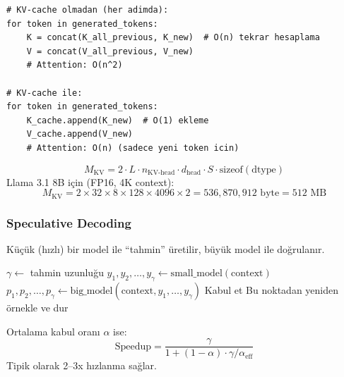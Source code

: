 \begin{lstlisting}
# KV-cache olmadan (her adimda):
for token in generated_tokens:
    K = concat(K_all_previous, K_new)  # O(n) tekrar hesaplama
    V = concat(V_all_previous, V_new)
    # Attention: O(n^2)

# KV-cache ile:
for token in generated_tokens:
    K_cache.append(K_new)  # O(1) ekleme
    V_cache.append(V_new)
    # Attention: O(n) (sadece yeni token icin)
\end{lstlisting}

\begin{formulbox}
\begin{equation}
M_{\text{KV}} = 2 \cdot L \cdot n_{\text{KV-head}} \cdot d_{\text{head}} \cdot S \cdot \text{sizeof}(\text{dtype})
\label{eq:kv-cache-size}
\end{equation}
Llama 3.1 8B i\c{c}in (FP16, 4K context):
\[
M_{\text{KV}} = 2 \times 32 \times 8 \times 128 \times 4096 \times 2 = 536{,}870{,}912 \text{ byte} = 512 \text{ MB}
\]
\end{formulbox}


\subsubsection{Speculative Decoding}

K\"{u}\c{c}\"{u}k (h{\i}zl{\i}) bir model ile ``tahmin'' \"{u}retilir, b\"{u}y\"{u}k model ile do\u{g}rulan{\i}r.

\begin{algorithm}[H]
\caption{Speculative Decoding}
\label{alg:speculative}
\begin{algorithmic}[1]
\State $\gamma \gets$ tahmin uzunlu\u{g}u
\State $y_1, y_2, \ldots, y_\gamma \gets \text{small\_model}(\text{context})$ 
\State $p_1, p_2, \ldots, p_\gamma \gets \text{big\_model}(\text{context}, y_1, \ldots, y_\gamma)$ 
   
    \State Kabul et
  \Else
    \State Bu noktadan yeniden \"{o}rnekle ve dur
  \EndIf
\EndFor
\end{algorithmic}
\end{algorithm}

\begin{formulbox}
Ortalama kabul oran{\i} $\alpha$ ise:
\begin{equation}
\text{Speedup} = \frac{\gamma}{1 + (1-\alpha) \cdot \gamma / \alpha_{\text{eff}}}
\label{eq:spec-speedup}
\end{equation}
Tipik olarak 2--3x h{\i}zlanma sa\u{g}lar.
\end{formulbox}


